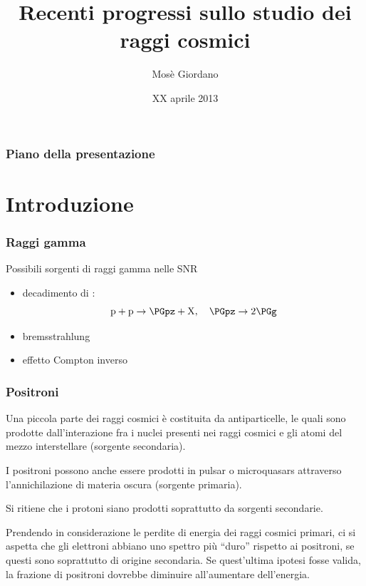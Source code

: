 \documentclass[10pt]{beamer}
\title{Recenti progressi sullo studio dei raggi cosmici}
\author{Mosè Giordano}
\date{XX aprile 2013}
\institute[UniSalento]{Università del Salento}
\begin{document}
\begin{frame}
  \maketitle
\end{frame}

\begin{frame}
  \frametitle{Piano della presentazione}
  \tableofcontents
\end{frame}

\section[Intro]{Introduzione}

\begin{frame}
  \frametitle{}

\end{frame}

\begin{frame}
  \frametitle{Raggi gamma}
  Possibili sorgenti di raggi gamma nelle SNR
  \begin{itemize}[<+->]
  \item decadimento di \PGpz:
    \begin{equation*}
      \text{p} + \text{p} \to \PGpz + \text{X}, \quad \PGpz \to 2\PGg
    \end{equation*}
  \item bremsstrahlung
  \item effetto Compton inverso
  \end{itemize}
\end{frame}


\begin{frame}
  \frametitle{Positroni}
  Una piccola parte dei raggi cosmici è costituita da antiparticelle, le quali
  sono prodotte dall'interazione fra i nuclei presenti nei raggi cosmici e gli
  atomi del mezzo interstellare (\alert{sorgente secondaria}).

  I positroni possono anche essere prodotti in pulsar o microquasars attraverso
  l'annichilazione di materia oscura (\alert{sorgente primaria}).

  Si ritiene che i protoni siano
  \alert{prodotti soprattutto da sorgenti secondarie}.

  Prendendo in considerazione le perdite di energia dei raggi cosmici primari,
  ci si aspetta che gli elettroni abbiano uno spettro più ``duro'' rispetto ai
  positroni, se questi sono soprattutto di origine secondaria.  Se quest'ultima
  ipotesi fosse valida,
  \alert{la frazione di positroni dovrebbe diminuire all'aumentare
    dell'energia}.
\end{frame}
\end{document}
